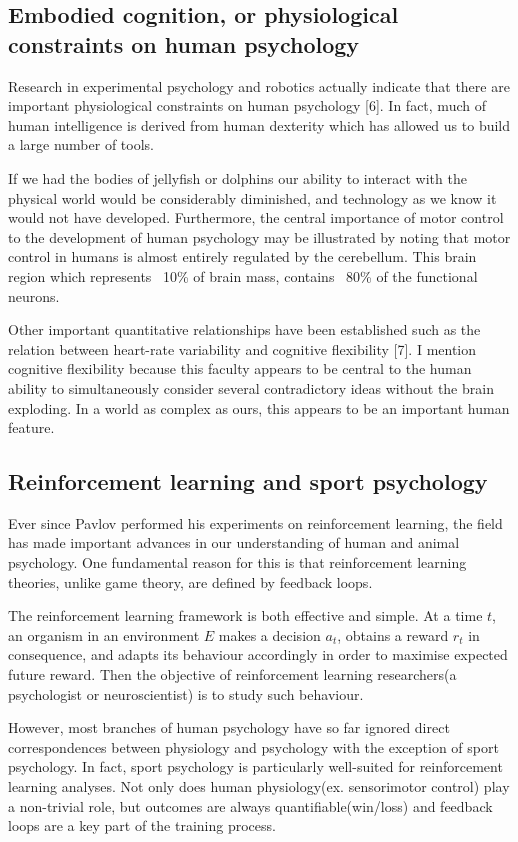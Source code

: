 \documentclass{article}
\begin{document}
\subsection{Embodied cognition, or physiological constraints on human psychology}

Research in experimental psychology and robotics actually indicate that there are important physiological constraints on human psychology [6]. In fact, much of human intelligence is derived from human dexterity which has allowed us to build a large number of tools. 

If we had the bodies of jellyfish or dolphins our ability to interact with the physical world would be considerably diminished, and technology as we know it would not have developed. Furthermore, the central importance of motor control to the development of human psychology may be illustrated by noting that motor control in humans is almost entirely regulated by the cerebellum. This brain region which represents ~10\% of brain mass, contains ~80\% of the functional neurons.

Other important quantitative relationships have been established such as the relation between heart-rate variability and cognitive flexibility [7]. I mention cognitive flexibility because this faculty appears to be central to the human ability to simultaneously consider several contradictory ideas without the brain exploding. In a world as complex as ours, this appears to be an important human feature.  

\subsection{Reinforcement learning and sport psychology}

Ever since Pavlov performed his experiments on reinforcement learning, the field has made important advances in our understanding of human and animal psychology. One fundamental reason for this is that reinforcement learning theories, unlike game theory, are defined by feedback loops.

The reinforcement learning framework is both effective and simple. At a time $t$, an organism in an environment $E$ makes a decision $a_t$, obtains a reward $r_t$ in consequence, and adapts its behaviour accordingly in order to maximise expected future reward. Then the objective of reinforcement learning researchers(a psychologist or neuroscientist) is to study such behaviour. 

However, most branches of human psychology have so far ignored direct correspondences between physiology and psychology with the exception of sport psychology. In fact, sport psychology is particularly well-suited for reinforcement learning analyses. Not only does human physiology(ex. sensorimotor control) play a non-trivial role, but outcomes are always quantifiable(win/loss) and feedback loops are a key part of the training process. 
\end{document}
